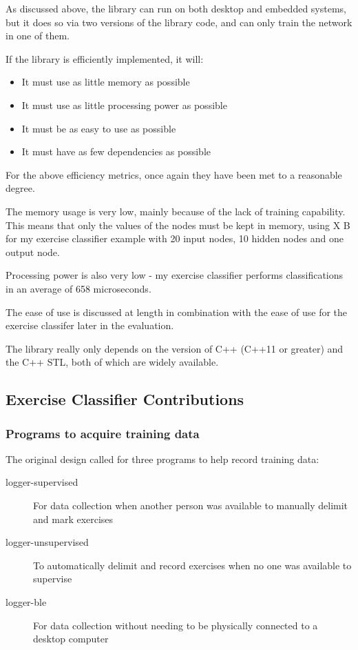 \documentclass[a4paper]{article}
\begin{document}
As discussed above, the library can run on both desktop and embedded systems, but it does so via two versions of the library code, and can only train the network in one of them.

If the library is efficiently implemented, it will:

\begin{itemize}
\item It must use as little memory as possible
\item It must use as little processing power as possible
\item It must be as easy to use as possible
\item It must have as few dependencies as possible
\end{itemize}

For the above efficiency metrics, once again they have been met to a reasonable degree. 

The memory usage is very low, mainly because of the lack of training capability. This means that only the values of the nodes must be kept in memory, using X B for my exercise classifier example with 20 input nodes, 10 hidden nodes and one output node. 

Processing power is also very low - my exercise classifier performs classifications in an average of 658 microseconds\cite{dsref0}. 

The ease of use is discussed at length in combination with the ease of use for the exercise classifer later in the evaluation.

The library really only depends on the version of C++ (C++11 or greater) and the C++ STL, both of which are widely available. 

\subsection{Exercise Classifier Contributions}%

\subsubsection{Programs to acquire training data}

The original design called for three programs to help record training data:


\begin{description}
\item[logger-supervised] For data collection when another person was available to manually delimit and mark exercises
\item[logger-unsupervised] To automatically delimit and record exercises when no one was available to supervise
\item[logger-ble] For data collection without needing to be physically connected to a desktop computer
\end{description}
\end{document}
